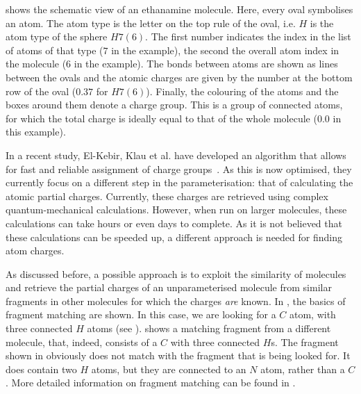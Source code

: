  shows the schematic view of an ethanamine molecule. Here, every oval symbolises an atom. The atom type is the letter on the top rule of the oval, i.e. $H$ is the atom type of the sphere $H7 (6)$. The first number indicates the index in the list of atoms of that type ($7$ in the example), the second the overall atom index in the molecule ($6$ in the example). The bonds between atoms are shown as lines between the ovals and the atomic charges are given by the number at the bottom row of the oval ($0.37$ for $H7 (6)$). Finally, the colouring of the atoms and the boxes around them denote a charge group. This is a group of connected atoms, for which the total charge is ideally equal to that of the whole molecule ($0.0$ in this example).

In a recent study, El-Kebir, Klau et al. have developed an algorithm that allows for fast and reliable assignment of charge groups~\cite{canzar2012charge}. As this is now optimised, they currently focus on a different step in the parameterisation: that of calculating the atomic partial charges. Currently, these charges are retrieved using complex quantum-mechanical calculations. However, when run on larger molecules, these calculations can take hours or even days to complete. As it is not believed that these calculations can be speeded up, a different approach is needed for finding atom charges.

As discussed before, a possible approach is to exploit the similarity of molecules and retrieve the partial charges of an unparameterised molecule from similar fragments in other molecules for which the charges \emph{are} known. In , the basics of fragment matching are shown. In this case, we are looking for a $C$ atom, with three connected $H$ atoms (see ).  shows a matching fragment from a different molecule, that, indeed, consists of a $C$ with three connected $H$s. The fragment shown in  obviously does not match with the fragment that is being looked for. It does contain two $H$ atoms, but they are connected to an $N$ atom, rather than a $C$. More detailed information on fragment matching can be found in .

